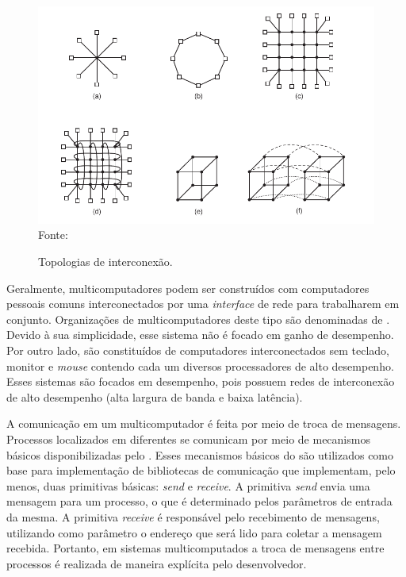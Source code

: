 \begin{figure}[t]
	\centering
        \caption{Topologias de interconexão.}
	\includegraphics[width=\textwidth]{figs/topologia.pdf} \\
    Fonte:~\cite{Tanenbaum2015}
    \label{fig:topologia}
\end{figure}


Geralmente, multicomputadores podem ser construídos com computadores pessoais
comuns interconectados por uma \textit{interface} de rede para trabalharem em
conjunto. Organizações de multicomputadores deste tipo são denominadas de \now. Devido à sua
simplicidade, esse sistema não é focado em ganho de desempenho. Por outro lado, \cow
são constituídos de computadores interconectados sem teclado, monitor e \textit{mouse} contendo cada
um diversos processadores de alto desempenho. Esses sistemas são focados em desempenho, pois
possuem redes de interconexão de alto desempenho (alta largura de banda e baixa latência).

A comunicação em um multicomputador é feita por meio de troca de mensagens.
Processos localizados em diferentes \cpus se comunicam por meio de mecanismos básicos
disponibilizadas pelo \so. Esses mecanismos básicos do \so são utilizados como base para implementação
de bibliotecas de comunicação que implementam, pelo menos, duas primitivas básicas: \textit{send} e \textit{receive}.
A primitiva \textit{send} envia uma mensagem para um processo, o que é determinado pelos
parâmetros de entrada da mesma. A primitiva \textit{receive} é responsável pelo recebimento
de mensagens, utilizando como parâmetro o endereço que será lido para coletar a
mensagem recebida. Portanto, em sistemas multicomputados a troca de mensagens
entre processos é realizada de maneira explícita pelo desenvolvedor.


